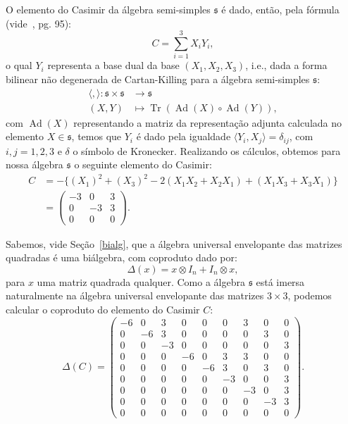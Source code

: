 \documentclass[twoside,openright,titlepage,numbers=noenddot,headinclude,  lineheaders footinclude=true,cleardoublepage=empty,
                                BCOR=5mm,paper=a4,fontsize=12pt ]{scrbook}
\theoremstyle{definition}
\DeclareMathOperator{\Tr}{Tr}
\DeclareMathOperator{\Adj}{Ad}
\begin{document}
O elemento do Casimir da álgebra semi-simples $\mathfrak{s}$ é dado, então,  pela fórmula (vide~\cite{algebra}, pg. 95):
\[
C = \sum_{i=1}^3 X_i Y_i,
\]
o qual $Y_i$ representa a base dual da base $(X_1, X_2, X_3)$, i.e., dada a forma bilinear não degenerada
de Cartan-Killing para a álgebra semi-simples $\mathfrak{s}$:
\begin{align*}
\langle, \rangle: \mathfrak{s} \times \mathfrak{s} &\rightarrow \mathfrak{s}\\
(X,Y) &\mapsto \Tr( \Adj(X) \circ \Adj(Y) ),
\end{align*}
com $\Adj(X)$ representando a matriz da representação adjunta calculada no elemento $X \in \mathfrak{s}$, temos 
que $Y_i$ é dado pela igualdade $ \langle Y_i, X_j \rangle = \delta_{ij}$, com $i,j = 1,2,3$ e $\delta$ o
símbolo de Kronecker. Realizando os cálculos, obtemos para nossa álgebra $\mathfrak{s}$ o 
seguinte elemento do Casimir: 
\begin{align*}
  C  &= -\{ (X_1)^2 + (X_3)^2 -2(X_1X_2 + X_2X_1) + (X_1X_3 +X_3X_1) \}\\
&=
\begin{pmatrix}
   -3&   0 & 3\\
   0&   -3 & 3\\
   0&   0 &  0
\end{pmatrix}
.
\end{align*}


Sabemos, vide Seção~\ref{bialg}, que a álgebra universal envelopante das matrizes quadradas é uma biálgebra,
com coproduto dado por:
\[
\Delta(x) = x \otimes I_n + I_n \otimes x,
\]
para $x$ uma matriz quadrada qualquer. Como a álgebra $\mathfrak{s}$ está imersa naturalmente na álgebra 
universal envelopante das matrizes $3 \times 3$, podemos calcular o coproduto do elemento do Casimir $C$:
\[
\Delta(C) = 
\begin{pmatrix}
   -6 &  0 & 3 &  0 &  0 &  0 & 3 &  0 &  0\\ 
   0 &  -6 & 3 &  0 &  0 &  0 &  0 & 3 &  0\\
   0 &  0 &  -3 &  0 &  0 &  0 &  0 &  0 & 3\\
   0 &  0 &  0 &  -6 &  0 & 3 & 3 &  0 &  0\\
   0 &  0 &  0 &  0 &  -6 & 3 &  0 & 3 &  0\\
   0 &  0 &  0 &  0 &  0 &  -3 &  0 &  0 & 3\\
   0 &  0 &  0 &  0 &  0 &  0 &  -3 &  0 & 3\\
   0 &  0 &  0 &  0 &  0 &  0 &  0 &  -3 & 3\\
   0 &  0 &  0 &  0 &  0 &  0 &  0 &  0 &  0
\end{pmatrix}
.
\]
\end{document}
